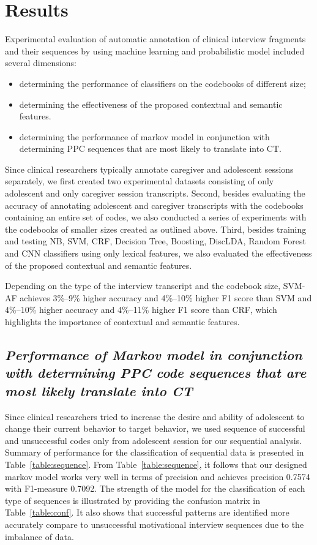 \documentclass{amia}
\begin{document}
\section*{Results}
Experimental evaluation of automatic annotation of clinical interview fragments and their sequences by using machine learning and probabilistic model included several dimensions:
\begin{itemize}
\item determining the performance of classifiers on the codebooks of different size;
\item determining the effectiveness of the proposed contextual and semantic features.
\item determining the performance of markov model in conjunction with determining PPC sequences that are most likely to translate into CT.
\end{itemize}

Since clinical researchers typically annotate caregiver and adolescent sessions separately, we first created two experimental datasets consisting of only adolescent and only caregiver session transcripts. Second, besides evaluating the accuracy of annotating adolescent and caregiver transcripts with the codebooks containing an entire set of codes, we also conducted a series of experiments with the codebooks of smaller sizes created as outlined above. Third, besides training and testing NB, SVM, CRF, Decision Tree, Boosting, DiscLDA, Random Forest and CNN classifiers using only lexical features, we also evaluated the effectiveness of the proposed contextual and semantic features.

Depending on the type of the interview transcript and the codebook size, SVM-AF achieves 3\%--9\% higher accuracy and 4\%--10\% higher F1 score than SVM and 4\%--10\% higher accuracy and 4\%--11\% higher F1 score than CRF, which highlights the importance of contextual and semantic features.

\subsection*{\textit{Performance of Markov model in conjunction with determining PPC code sequences that are most likely translate into CT}}
Since clinical researchers tried to increase the desire and ability of adolescent to change their current behavior to target behavior, we used sequence of successful and unsuccessful codes only from adolescent session for our sequential analysis. Summary of performance for the classification of sequential data is presented in Table~\ref{table:sequence}. 
From Table~\ref{table:sequence}, it follows that our designed markov model works very well in terms of precision and achieves precision 0.7574 with F1-measure 0.7092. The strength of the model for the classification of each type of sequences is illustrated by providing the confusion matrix in Table~\ref{table:conf}. It also shows that successful patterns are identified more accurately compare to unsuccessful motivational interview sequences due to the imbalance of data.
\end{document}
